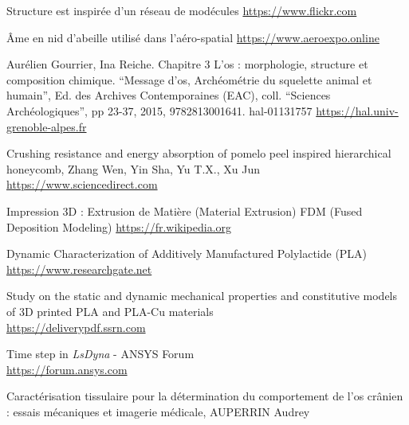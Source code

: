 \documentclass[a4paper]{article}
\begin{document}
	\cleardoublepage
	\begin{thebibliography}{9}
		Structure est inspirée d'un réseau de modécules
		\href{https://www.flickr.com/photos/jonolist/3323526494}{https://www.flickr.com}
		
		Âme en nid d'abeille utilisé dans l'aéro-spatial
		\href{https://www.aeroexpo.online/fr/prod/toray-advanced-composites/product-172149-61191.html}{https://www.aeroexpo.online}
		
		Aurélien Gourrier, Ina Reiche. Chapitre 3 L’os : morphologie, structure et composition chimique. “Message d’os, Archéométrie du squelette animal et humain”, Ed. des Archives Contemporaines
		(EAC), coll. “Sciences Archéologiques”, pp 23-37, 2015, 9782813001641. hal-01131757
		\href{https://hal.univ-grenoble-alpes.fr/hal-01131757/file/Chap03_Hall.pdf}{https://hal.univ-grenoble-alpes.fr}
		
		Crushing resistance and energy absorption of pomelo peel inspired hierarchical honeycomb, Zhang Wen, Yin Sha, Yu T.X., Xu Jun
		\href{https://www.sciencedirect.com/science/article/abs/pii/S0734743X1830633X}{https://www.sciencedirect.com}
		
		Impression 3D : Extrusion de Matière (Material Extrusion) FDM (Fused Deposition Modeling)
		\href{https://fr.wikipedia.org/wiki/Impression_3D#FDM_(Fused_Deposition_Modeling)}{https://fr.wikipedia.org}
		
		Dynamic Characterization of Additively Manufactured Polylactide (PLA)\\
		\href{https://www.researchgate.net/publication/357340590_Dynamic_Characterization_of_Additively_Manufactured_Polylactide_PLA}{https://www.researchgate.net}
		
		Study on the static and dynamic mechanical properties and constitutive models of 3D printed PLA and PLA-Cu materials\\
		\href{https://deliverypdf.ssrn.com/delivery.php?ID=116093024026078112087086014071000018025036007092012071117040062113114125006073000082087084124008071071106092083089084106089112022084021086019038002106071089091118068093109064000100076075000008015046108025061089024124023099097096109019108127110120118076106116065066001117066080116076008065091&EXT=pdf}{https://deliverypdf.ssrn.com}
		
		Time step in \textit{LsDyna} - ANSYS Forum\\
		\href{https://forum.ansys.com/forums/topic/maximum-time-step/}{https://forum.ansys.com}
		
		Caractérisation tissulaire pour la détermination du comportement de l'os crânien : essais mécaniques et imagerie médicale, AUPERRIN Audrey\\
	\end{thebibliography}
\end{document}
